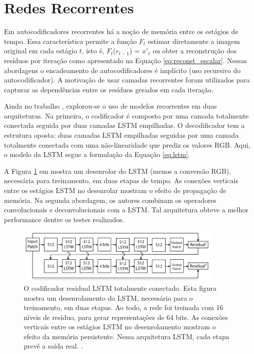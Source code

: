 \section{Redes Recorrentes}



Em autocodificadores recorrentes há a noção de memória entre os estágios de tempo. Essa característica permite a função  $F_t$  estimar diretamente a imagem original em cada estágio $t$, isto é, $F_t$($r_{t-1}$) = $x'_{t}$ ou obter a reconstrução dos resíduos por iteração como apresentado na Equação \ref{eq:reconst_escalar}. 
Nessas abordagens o encadeamento de autocodificadores é implícito (uso recursivo do autocodificador). A motivação de usar camadas recorrentes foram utilizados para capturar as dependências entre os resíduos gerados em cada iteração. 

Ainda no trabalho \cite{Variable2016Toderici}, explorou-se o uso de modelos recorrentes em duas arquiteturas. Na primeira, o codificador é composto por uma camada totalmente conectada seguida por duas camadas LSTM empilhadas. O decodificador tem a estrutura oposta: duas camadas LSTM empilhadas seguidas por uma camada totalmente conectada com uma não-linearidade que prediz os valores RGB. Aqui, o modelo da LSTM segue a formulação da Equação \ref{eq:lstm}.

A Figura \ref{fig:toderici_ae_lstm} em mostra um desenrolar do LSTM (menos a conversão RGB), necessária para treinamento, em duas etapas de tempo. As conexões verticais entre os estágios LSTM no desenrolar mostram o efeito de propagação de memória. 
Na segunda abordagem, os autores combinam os operadores convolucionais e deconvolucionais com a LSTM. Tal arquitetura obteve a melhor performance dentre os testes realizados. %


\begin{figure}[h]
	\centering
	\includegraphics[width=0.90\textwidth]{figuras/ae_lstm.pdf}
	\caption{O codificador residual LSTM totalmente conectado.  Esta figura mostra um desenrolamento do LSTM, necessário para o treinamento, em duas etapas.  Ao todo, a rede foi treinada com 16 níveis de resíduo, para gerar representações de 64 bits. As conexões verticais entre os estágios LSTM no desenrolamento mostram o efeito da memória persistente. Nessa arquitetura LSTM, cada etapa prevê a saída real. \cite{Variable2016Toderici}.}
	\label{fig:toderici_ae_lstm}
\end{figure}

